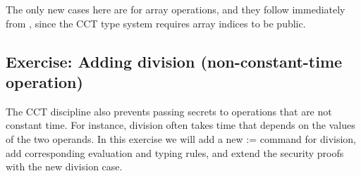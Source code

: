 \documentclass[12pt]{report}
\begin{document}
    The only new cases here are for array operations, and they follow
    immediately from , since the CCT type system requires
    array indices to be public. 
\begin{coqdoccode}
\coqdocemptyline
\end{coqdoccode}
\subsection{Exercise: Adding division (non-constant-time operation)}



 The CCT discipline also prevents passing secrets to operations that are not
    constant time. For instance, division often takes time that depends on the
    values of the two operands. In this exercise we will add a new
     :=    command for division, add corresponding evaluation and
    typing rules, and extend the security proofs with the new division case. 
\end{document}
